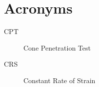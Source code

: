 
\chapter{Acronyms}
\begin{description}
\item[CPT] Cone Penetration Test
\item[CRS] Constant Rate of Strain

\end{description}